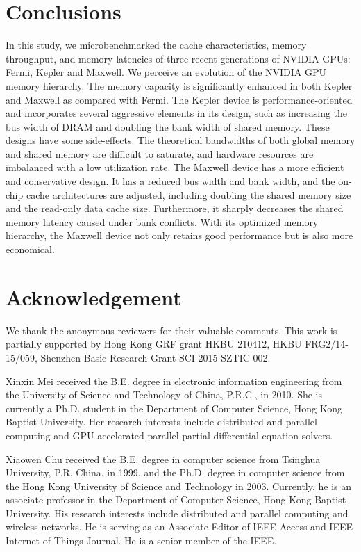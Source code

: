 \documentclass[10pt,journal,compsoc]{IEEEtran}
\theoremstyle{definition}
\begin{document}
\section{Conclusions}


In this study, we microbenchmarked the cache characteristics, memory throughput, and memory latencies of three recent generations of NVIDIA GPUs: Fermi, Kepler and Maxwell. We perceive an evolution of the NVIDIA GPU memory hierarchy. The memory capacity is significantly enhanced in both Kepler and Maxwell as compared with Fermi. The Kepler device is performance-oriented and incorporates several aggressive elements in its design, such as increasing the bus width of DRAM and doubling the bank width of shared memory. These designs have some side-effects. The theoretical bandwidths of both global memory and shared memory are difficult to saturate, and hardware resources are imbalanced with a low utilization rate. The Maxwell device has a more efficient and conservative design. It has a reduced bus width and bank width, and the on-chip cache architectures are adjusted, including doubling the shared memory size and the read-only data cache size. Furthermore, it sharply decreases the shared memory latency caused under bank conflicts. With its optimized memory hierarchy, the Maxwell device not only retains good performance but is also more economical.

\section*{Acknowledgement}
We thank the anonymous reviewers for their valuable comments. This work is partially supported by Hong Kong GRF grant HKBU 210412, HKBU FRG2/14-15/059, Shenzhen Basic Research Grant SCI-2015-SZTIC-002.





\begin{IEEEbiography}
{Xinxin Mei}
received the B.E. degree in electronic information engineering from the University of Science and Technology of China, P.R.C., in 2010. She is currently a Ph.D. student in the Department of Computer Science, Hong Kong Baptist University. Her research interests include distributed and parallel computing and GPU-accelerated parallel partial differential equation solvers.
\end{IEEEbiography}

\begin{IEEEbiography}
{Xiaowen Chu}
received the B.E. degree in computer science from Tsinghua University, P.R. China, in 1999, and the Ph.D. degree in computer science from the Hong Kong University of Science and Technology in 2003. Currently, he is an associate professor in the Department of Computer Science, Hong Kong Baptist University. His research interests include distributed and parallel computing and wireless networks. He is serving as an Associate Editor of IEEE Access and IEEE Internet of Things Journal. He is a senior member of the IEEE.
\end{IEEEbiography}
\end{document}
